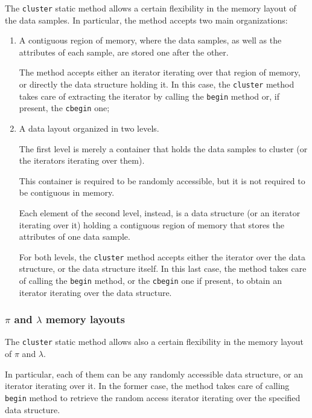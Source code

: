 \documentclass{article}
\begin{document}
The \texttt{cluster} static method allows a certain flexibility in the memory layout of the data
samples. In particular, the method accepts two main organizations:
\begin{enumerate}
\item A contiguous region of memory, where the data samples, as well as the attributes of each
sample,
are stored one after the other.

The method accepts either an iterator iterating over that region of memory, or directly the data
structure holding it. In this case, the \texttt{cluster} method takes care of extracting the
iterator by calling the \texttt{begin} method or, if present, the \texttt{cbegin} one;

\item A data layout organized in two levels.

The first level is merely a container that holds the data samples to cluster (or the iterators
iterating over them).

This container is required to be randomly accessible, but it is not required to be contiguous in
memory.

Each element of the second level, instead, is a data structure (or an iterator iterating over it)
holding a
contiguous region of memory that stores the attributes of one data sample.

For both levels, the \texttt{cluster} method accepts either the iterator over the data structure, or
the data structure itself. In this last case, the method takes care of calling the
\texttt{begin} method, or the \texttt{cbegin} one if present, to obtain an iterator iterating
over the data structure.

\end{enumerate}

\hypertarget{par-pi-lambda-layout}{
\subsubsection{\texorpdfstring{\boldmath$\pi$ and \boldmath$\lambda$}{pi and lambda} memory layouts}
\label{par-pi-lambda-layout}}

The \texttt{cluster} static method allows also a certain flexibility in the memory layout
of $\pi$ and $\lambda$.

In particular, each of them can be any randomly accessible data structure, or an iterator
iterating over it.
In the former case, the method takes care of calling \texttt{begin} method to retrieve the
random access iterator iterating over the specified data structure.
\end{document}
